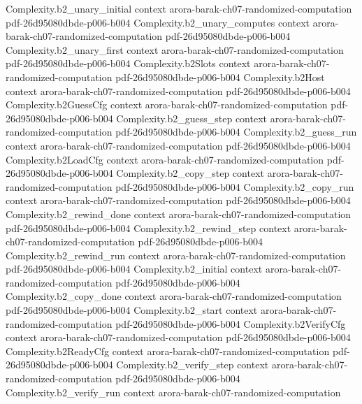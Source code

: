 \begin{theorem}
\proofstep
  {Complexity.b2_unary_initial}
  {context}
  {arora-barak-ch07-randomized-computation}
  {pdf-26d95080dbde-p006-b004}
\proofstep
  {Complexity.b2_unary_computes}
  {context}
  {arora-barak-ch07-randomized-computation}
  {pdf-26d95080dbde-p006-b004}
\proofstep
  {Complexity.b2_unary_first}
  {context}
  {arora-barak-ch07-randomized-computation}
  {pdf-26d95080dbde-p006-b004}
\proofstep
  {Complexity.b2Slots}
  {context}
  {arora-barak-ch07-randomized-computation}
  {pdf-26d95080dbde-p006-b004}
\proofstep
  {Complexity.b2Host}
  {context}
  {arora-barak-ch07-randomized-computation}
  {pdf-26d95080dbde-p006-b004}
\proofstep
  {Complexity.b2GuessCfg}
  {context}
  {arora-barak-ch07-randomized-computation}
  {pdf-26d95080dbde-p006-b004}
\proofstep
  {Complexity.b2_guess_step}
  {context}
  {arora-barak-ch07-randomized-computation}
  {pdf-26d95080dbde-p006-b004}
\proofstep
  {Complexity.b2_guess_run}
  {context}
  {arora-barak-ch07-randomized-computation}
  {pdf-26d95080dbde-p006-b004}
\proofstep
  {Complexity.b2LoadCfg}
  {context}
  {arora-barak-ch07-randomized-computation}
  {pdf-26d95080dbde-p006-b004}
\proofstep
  {Complexity.b2_copy_step}
  {context}
  {arora-barak-ch07-randomized-computation}
  {pdf-26d95080dbde-p006-b004}
\proofstep
  {Complexity.b2_copy_run}
  {context}
  {arora-barak-ch07-randomized-computation}
  {pdf-26d95080dbde-p006-b004}
\proofstep
  {Complexity.b2_rewind_done}
  {context}
  {arora-barak-ch07-randomized-computation}
  {pdf-26d95080dbde-p006-b004}
\proofstep
  {Complexity.b2_rewind_step}
  {context}
  {arora-barak-ch07-randomized-computation}
  {pdf-26d95080dbde-p006-b004}
\proofstep
  {Complexity.b2_rewind_run}
  {context}
  {arora-barak-ch07-randomized-computation}
  {pdf-26d95080dbde-p006-b004}
\proofstep
  {Complexity.b2_initial}
  {context}
  {arora-barak-ch07-randomized-computation}
  {pdf-26d95080dbde-p006-b004}
\proofstep
  {Complexity.b2_copy_done}
  {context}
  {arora-barak-ch07-randomized-computation}
  {pdf-26d95080dbde-p006-b004}
\proofstep
  {Complexity.b2_start}
  {context}
  {arora-barak-ch07-randomized-computation}
  {pdf-26d95080dbde-p006-b004}
\proofstep
  {Complexity.b2VerifyCfg}
  {context}
  {arora-barak-ch07-randomized-computation}
  {pdf-26d95080dbde-p006-b004}
\proofstep
  {Complexity.b2ReadyCfg}
  {context}
  {arora-barak-ch07-randomized-computation}
  {pdf-26d95080dbde-p006-b004}
\proofstep
  {Complexity.b2_verify_step}
  {context}
  {arora-barak-ch07-randomized-computation}
  {pdf-26d95080dbde-p006-b004}
\proofstep
  {Complexity.b2_verify_run}
  {context}
  {arora-barak-ch07-randomized-computation}

\end{theorem}
